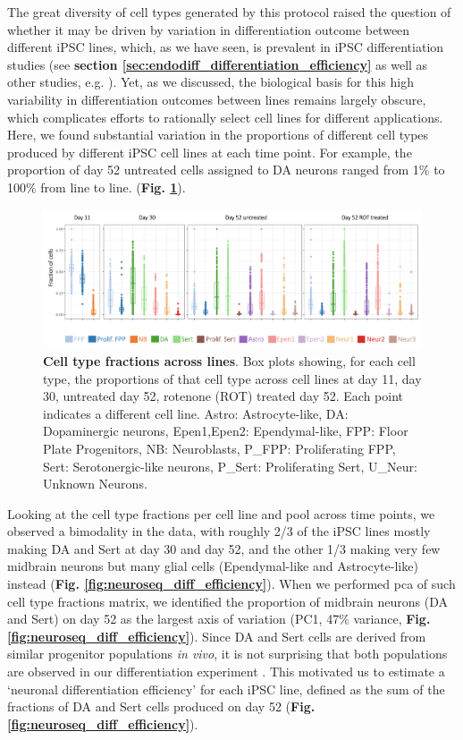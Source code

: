 The great diversity of cell types generated by this protocol raised the question of whether it may be driven by variation in differentiation outcome between different iPSC lines, which, as we have seen, is prevalent in iPSC differentiation studies (see \textbf{section \ref{sec:endodiff_differentiation_efficiency}} as well as other studies, e.g. \cite{d2019association, volpato2018reproducibility}). 
Yet, as we discussed, the biological basis for this high variability in differentiation outcomes between lines remains largely obscure, which complicates efforts to rationally select cell lines for different applications. 
Here, we found substantial variation in the proportions of different cell types produced by different iPSC cell lines at each time point. 
For example, the proportion of day 52 untreated cells assigned to DA neurons ranged from 1\% to 100\% from line to line.
(\textbf{Fig. \ref{fig:neuroseq_line_variation}}).

\begin{figure}[h]
\includegraphics[width=15.5cm]{Chapter5/Fig/neuroseq_line_celltype.png}
\caption[Cell type fractions across lines]{\textbf{Cell type fractions across lines}.
Box plots showing, for each cell type, the proportions of that cell type across cell lines at day 11, day 30, untreated day 52, rotenone (ROT) treated day 52. 
Each point indicates a different cell line. 
Astro: Astrocyte-like, DA: Dopaminergic neurons, Epen1,Epen2: Ependymal-like, FPP: Floor Plate Progenitors, NB: Neuroblasts, P\_FPP: Proliferating FPP, Sert: Serotonergic-like neurons, P\_Sert: Proliferating Sert, U\_Neur: Unknown Neurons.}
\label{fig:neuroseq_line_variation}
\end{figure}


Looking at the cell type fractions per cell line and pool across time points, we observed a bimodality in the data, with roughly 2/3 of the iPSC lines mostly making DA and Sert at day 30 and day 52, and the other 1/3 making very few midbrain neurons but many glial cells (Ependymal-like and Astrocyte-like) instead (\textbf{Fig. \ref{fig:neuroseq_diff_efficiency}}).
When we performed \gls{pca} of such cell type fractions matrix, we identified the proportion of midbrain neurons (DA and Sert) on day 52 as the largest axis of variation (PC1, 47\% variance, \textbf{Fig. \ref{fig:neuroseq_diff_efficiency}}). 
Since DA and Sert cells are derived from similar progenitor populations \textit{in vivo}, it is not surprising that both populations are observed in our differentiation experiment \cite{ye1998fgf, cao2017characterization}. 
This motivated us to estimate a `neuronal differentiation efficiency' for each iPSC line, defined as the sum of the fractions of DA and Sert cells produced on day 52 (\textbf{Fig. \ref{fig:neuroseq_diff_efficiency}}). 

